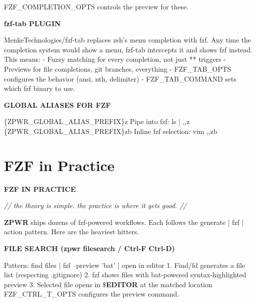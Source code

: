 \documentclass[11pt,a4paper,twoside]{book}
\begin{document}
FZF\_COMPLETION\_OPTS controls the preview for these.


\vspace{12pt}
{\bfseries\color{neonyellow} fzf-tab PLUGIN}\vspace{4pt}

MenkeTechnologies/fzf-tab replaces zsh's menu completion with fzf. Any time the completion system would show a menu, fzf-tab intercepts it and shows fzf instead. This means: - Fuzzy matching for every completion, not just ** triggers - Previews for file completions, git branches, everything - FZF\_TAB\_OPTS configures the behavior (ansi, nth, delimiter) - FZF\_TAB\_COMMAND sets which fzf binary to use.


\vspace{12pt}
{\bfseries\color{neonyellow} GLOBAL ALIASES FOR FZF}\vspace{4pt}

\begin{codebox}
\color{neongreen}\{ZPWR\_GLOBAL\_ALIAS\_PREFIX\}z   Pipe into fzf: ls | ,,z\\
\color{neongreen}\{ZPWR\_GLOBAL\_ALIAS\_PREFIX\}zb  Inline fzf selection: vim ,,zb\\
\end{codebox}


\vspace{16pt}

\section{FZF in Practice}


\vspace{10pt}
{\large\bfseries\color{neoncyan} FZF IN PRACTICE}\vspace{6pt}

{\small\itshape\color{dimtext} // the theory is simple. the practice is where it gets good. //}

\textbf{ZPWR} ships dozens of fzf-powered workflows. Each follows the generate | fzf | action pattern. Here are the heaviest hitters.


\vspace{12pt}
{\bfseries\color{neonyellow} FILE SEARCH (zpwr filesearch / Ctrl-F Ctrl-D)}\vspace{4pt}

Pattern: find files | fzf --preview 'bat' | open in editor 1. Find/fd generates a file list (respecting .gitignore) 2. fzf shows files with bat-powered syntax-highlighted preview 3. Selected file opens in \$\textbf{EDITOR} at the matched location FZF\_CTRL\_T\_OPTS configures the preview command.
\end{document}
